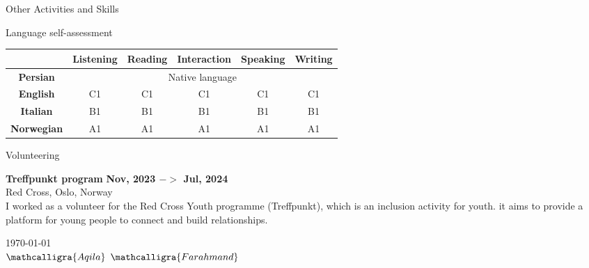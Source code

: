 \documentclass{resume} %
\begin{document}
\begin{rSection}{Other Activities and Skills}
        \begin{rNoListSubsection}{Language self-assessment}{}{}{}
            \begin{center}
                \begin{tabular}{|c|c|c|c|c|c|}
                    \hline
                    &\textbf{Listening}&\textbf{Reading}&\textbf{Interaction}&\textbf{Speaking}&\textbf{Writing}\\\hline
                    \textbf{Persian}&\multicolumn{5}{c}{Native language}\vline\\\hline
                    \textbf{English}&C1&C1&C1&C1&C1\\\hline
                    \textbf{Italian}&B1&B1&B1&B1&B1\\\hline
                    \textbf{Norwegian}&A1&A1&A1&A1&A1\\\hline
                \end{tabular}
            \end{center}
        \end{rNoListSubsection}


        \begin{rSubsection2}{ Volunteering }

            \item\textbf{ Treffpunkt program }\hfill \textbf{Nov, 2023 $->$ Jul, 2024}
            \\ Red Cross, Oslo, Norway
            \\ I worked as a volunteer for the Red Cross Youth programme (Treffpunkt), which is an inclusion activity for youth.
             it aims to provide a platform for young people to connect and build relationships.

        \end{rSubsection2}

    \end{rSection}
    
    \vspace{2em} %
    \begin{flushright}
        \today
        \\
        \vspace{1em}
        \Large$\mathcalligra{Aqila}$  $\mathcalligra{Farahmand}$

    \end{flushright}
    
\end{document}
